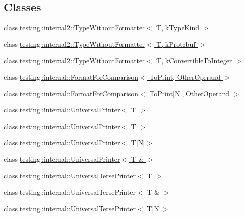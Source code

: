 \subsection*{Classes}
\begin{DoxyCompactItemize}
\item 
class \hyperlink{classtesting_1_1internal2_1_1_type_without_formatter}{testing\+::internal2\+::\+Type\+Without\+Formatter$<$ T, k\+Type\+Kind $>$}
\item 
class \hyperlink{classtesting_1_1internal2_1_1_type_without_formatter_3_01_t_00_01k_protobuf_01_4}{testing\+::internal2\+::\+Type\+Without\+Formatter$<$ T, k\+Protobuf $>$}
\item 
class \hyperlink{classtesting_1_1internal2_1_1_type_without_formatter_3_01_t_00_01k_convertible_to_integer_01_4}{testing\+::internal2\+::\+Type\+Without\+Formatter$<$ T, k\+Convertible\+To\+Integer $>$}
\item 
class \hyperlink{classtesting_1_1internal_1_1_format_for_comparison}{testing\+::internal\+::\+Format\+For\+Comparison$<$ To\+Print, Other\+Operand $>$}
\item 
class \hyperlink{classtesting_1_1internal_1_1_format_for_comparison_3_01_to_print[_n]_00_01_other_operand_01_4}{testing\+::internal\+::\+Format\+For\+Comparison$<$ To\+Print\mbox{[}\+N\mbox{]}, Other\+Operand $>$}
\item 
class \hyperlink{classtesting_1_1internal_1_1_universal_printer}{testing\+::internal\+::\+Universal\+Printer$<$ T $>$}
\item 
class \hyperlink{classtesting_1_1internal_1_1_universal_printer}{testing\+::internal\+::\+Universal\+Printer$<$ T $>$}
\item 
class \hyperlink{classtesting_1_1internal_1_1_universal_printer_3_01_t[_n]_4}{testing\+::internal\+::\+Universal\+Printer$<$ T\mbox{[}\+N\mbox{]}$>$}
\item 
class \hyperlink{classtesting_1_1internal_1_1_universal_printer_3_01_t_01_6_01_4}{testing\+::internal\+::\+Universal\+Printer$<$ T \& $>$}
\item 
class \hyperlink{classtesting_1_1internal_1_1_universal_terse_printer}{testing\+::internal\+::\+Universal\+Terse\+Printer$<$ T $>$}
\item 
class \hyperlink{classtesting_1_1internal_1_1_universal_terse_printer_3_01_t_01_6_01_4}{testing\+::internal\+::\+Universal\+Terse\+Printer$<$ T \& $>$}
\item 
class \hyperlink{classtesting_1_1internal_1_1_universal_terse_printer_3_01_t[_n]_4}{testing\+::internal\+::\+Universal\+Terse\+Printer$<$ T\mbox{[}\+N\mbox{]}$>$}

\end{DoxyCompactItemize}
